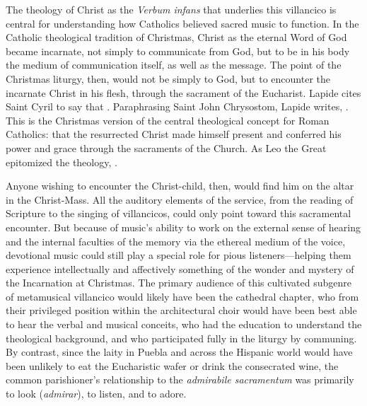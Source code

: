 The theology of Christ as the \emph{Verbum infans} that underlies this
villancico is central for understanding how Catholics believed sacred music to
function.
In the Catholic theological tradition of Christmas, Christ as the eternal Word
of God became incarnate, not simply to communicate  from God, but
to be in his body the medium of communication itself, as well as the message.
The point of the Christmas liturgy, then, would not be simply to  God, but to encounter the incarnate Christ in his flesh, through the
sacrament of the Eucharist.
Lapide cites Saint Cyril to say that .
Paraphrasing Saint John Chrysostom, Lapide writes, .%
    \Autocite
    [672, on : .]
    {Lapide:Gospels19C}
This is the Christmas version of the central theological concept for Roman
Catholics: that the resurrected Christ made himself present and conferred his
power and grace through the sacraments of the Church.
As Leo the Great epitomized the theology, .%
    \Autocite
    [398, Sermo II de Ascensione Domini: .]
    {Leo:SermonesPL}

Anyone wishing to encounter the Christ-child, then, would find him on the altar
in the Christ-Mass.
All the auditory elements of the service, from the reading of Scripture to the
singing of villancicos, could only point toward this sacramental encounter.
But because of music's ability to work on the external sense of hearing and the
internal faculties of the memory via the ethereal medium of the voice,
devotional music could still play a special role for pious listeners---helping
them experience intellectually and affectively something of the wonder and
mystery of the Incarnation at Christmas.
The primary audience of this cultivated subgenre of metamusical villancico would
likely have been the cathedral chapter, who from their privileged position
within the architectural choir would have been best able to hear the verbal and
musical conceits, who had the education to understand the theological
background, and who participated fully in the liturgy by communing.
By contrast, since the laity in Puebla and across the Hispanic world would have
been unlikely to eat the Eucharistic wafer or drink the consecrated wine, the
common parishioner's relationship to the \emph{admirabile sacramentum} was
primarily to look (\emph{admirar}), to listen, and to adore.

